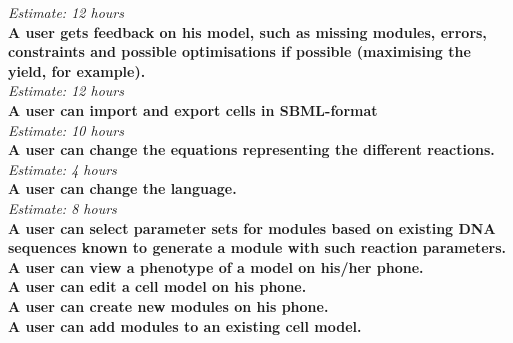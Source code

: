 \documentclass[10pt,a4paper]{report}
\begin{document}
		\indent
			\emph{Estimate: 12 hours}\\
		\textbf{A user gets feedback on his model, such as missing modules, errors, constraints and possible optimisations if possible (maximising the yield, for example).} \\
		\indent
			\emph{Estimate: 12 hours} \\
		\textbf{A user can import and export cells in SBML-format}\\
		\indent
			\emph{Estimate: 10 hours}\\
		\textbf{A user can change the equations representing the different reactions.} \\
		\indent
			\emph{Estimate: 4 hours} \\
		\textbf{A user can change the language.} \\
		\indent
			\emph{Estimate: 8 hours} \\
		\textbf{A user can select parameter sets for modules based on existing DNA sequences known to generate a module with such reaction parameters.} \\
		\textbf{A user can view a phenotype of a model on his/her phone.} \\
		\textbf{A user can edit a cell model on his phone.} \\
		\textbf{A user can create new modules on his phone.} \\
		\textbf{A user can add modules to an existing cell model.} \\

	\clearpage
\end{document}
